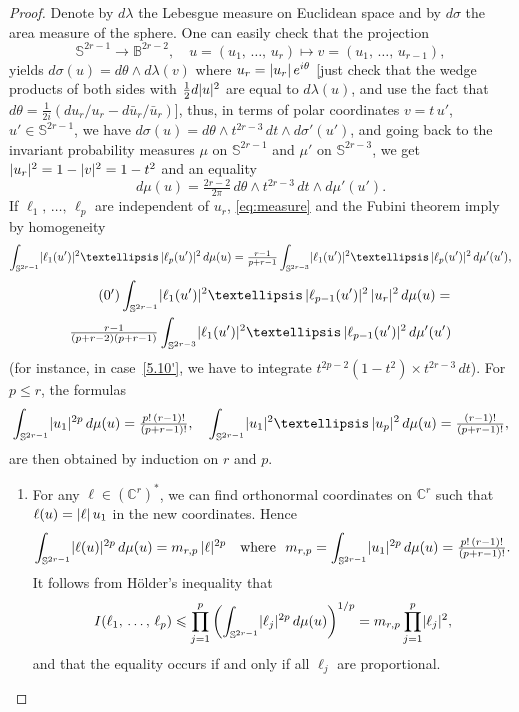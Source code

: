 \documentclass[10pt,a4paper]{amsart}
\numberwithin{equation}{section}
\DeclarePairedDelimiter{\abs}{\lvert}{\rvert}
\newcommand*\bC{\mathbb{C}}
\newcommand*\bS{\mathbb{S}}
\newcommand*\bB{\mathbb{B}}
\let\leq\leqslant
\theoremstyle{definition}\newtheorem{defi}[theo]{Definition}
\theoremstyle{remark}\newtheorem{rema}[theo]{Remark}
\begin{document}
\begin{proof}
Denote by $d\lambda$ the Lebesgue measure on Euclidean space and by $d\sigma$ the area measure of the sphere. One can easily check that the projection
\[
\bS^{2r-1}\to \bB^{2r-2},\quad u=\left(u_1,\,\dotsc,\,u_r\right)\mapsto v=\left(u_1,\,\dotsc,\,u_{r-1}\right),
\]
yields $d\sigma(u)=d\theta\wedge d\lambda(v)$ where $u_r=\abs{u_r}\,e^{i\theta}$ [just check that the wedge products of both sides with $\tfrac{1}{ 2}d\abs{u}^2$ are equal to $d\lambda(u)$, and use the fact that $d\theta=\tfrac{1}{ 2i}(du_r/u_r -d\bar u_r/\bar u_r)$], thus, in terms of polar coordinates $v=t\,u'$, $u'\in\bS^{2r-1}$, we have
$d\sigma(u)=d\theta\wedge t^{2r-3}\,dt\wedge d\sigma'(u')$, and going back to the invariant probability measures $\mu$ on $\bS^{2r-1}$ and $\mu'$ on $\bS^{2r-3}$, we get
$\abs{u_r}^2=1-\abs{v}^2=1-t^2$ and an equality
\begin{equation}\label{eq:measure}
d\mu(u)=\tfrac{2r-2}{ 2\pi}\,d\theta\wedge t^{2r-3}\,dt
\wedge d\mu'(u').
\end{equation}
If $\ell_1,\,\dotsc,\,\ell_p$ are independent of $u_r$, \eqref{eq:measure} and the Fubini theorem imply by homogeneity
\begin{align}\label{5.10}
\int_{\bS^{2r-1}}\abs{\ell_1(u')}^2\ldots\,\abs{\ell_p(u')}^2\,d\mu(u) =
\tfrac{r-1}{p+r-1}
\int_{\bS^{2r-3}}\abs{\ell_1(u')}^2\ldots\,\abs{\ell_p(u')}^2\,d\mu'(u'),
\end{align}
\begin{multline}\label{5.10'}
\tag{\theequation\ensuremath{'}}
\int_{\bS^{2r-1}}\abs{\ell_1(u')}^2\ldots\,\abs{\ell_{p-1}(u')}^2\,\abs{u_r}^2\,d\mu(u) =
\\
\tfrac{r-1}{(p+r-2)(p+r-1)} \int_{\bS^{2r-3}}\abs{\ell_1(u')}^2\ldots\,\abs{\ell_{p-1}(u')}^2\,d\mu'(u')
\end{multline}
(for instance, in case~\eqref{5.10'}, we have to integrate $t^{2p-2}(1-t^2)\times t^{2r-3}\,dt$). For $p\leq r$, the formulas
\[
\int_{\bS^{2r-1}}\abs{u_1}^{2p}\,d\mu(u)=\tfrac{p!\,(r-1)!}{ (p+r-1)!},\quad
\int_{\bS^{2r-1}}\abs{u_1}^2\ldots\,\abs{u_p}^2\,d\mu(u)=\tfrac{(r-1)!}{ (p+r-1)!},
\]
are then obtained by induction on $r$ and $p$.
\begin{enumerate}
\item For any $\ell\in(\bC^r)^*$, we can find orthonormal coordinates on $\bC^r$ such that $\ell(u)=\abs{\ell}\,u_1$ in the new coordinates. Hence
\[
\int_{\bS^{2r-1}}\abs{\ell(u)}^{2p}\,d\mu(u)=m_{r,p}\,\abs{\ell}^{2p}\quad
\text{where}~~m_{r,p}=\int_{\bS^{2r-1}}\abs{u_1}^{2p}\,d\mu(u)=
\tfrac{p!\,(r-1)!}{ (p+r-1)!}.
\]
It follows from H\"older's inequality that
\[
I(\ell_1,\,\dotsc,\,\ell_p)\leq \prod_{j=1}^p
\left(\int_{\bS^{2r-1}}\abs{\ell_j}^{2p}\,d\mu(u)\right)^{1/p}=m_{r,p}
\prod_{j=1}^p\abs{\ell_j}^2,
\]
and that the equality occurs if and only if all $\ell_j$ are proportional.


\end{enumerate}
\end{proof}
\end{document}
